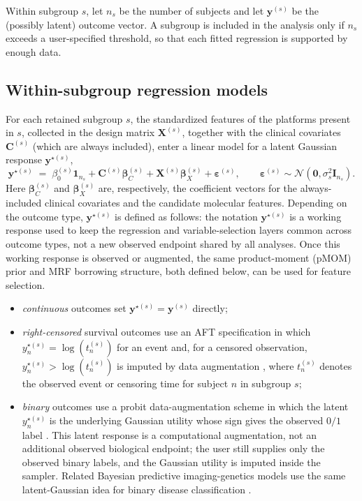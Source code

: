 \documentclass[article]{jss}
\begin{document}
Within subgroup $s$, let $n_s$ be the number of subjects and let
$\bm{y}^{(s)}$ be the (possibly latent) outcome vector. A subgroup is included
in the analysis only if $n_s$ exceeds a user-specified threshold, so that each
fitted regression is supported by enough data.

\subsection{Within-subgroup regression models}\label{sec:regression}

For each retained subgroup $s$, the standardized features of the platforms
present in $s$, collected in the design matrix $\bm{X}^{(s)}$, together with the
clinical covariates $\bm{C}^{(s)}$ (which are always included), enter a linear
model for a latent Gaussian response $\bm{y}^{\star(s)}$,
%
\begin{equation}\label{eq:linear}
  \bm{y}^{\star(s)} \;=\; \beta_0^{(s)}\bm{1}_{n_s}
  + \bm{C}^{(s)}\bm{\beta}_{C}^{(s)}
  + \bm{X}^{(s)}\bm{\beta}_{X}^{(s)} + \bm{\varepsilon}^{(s)},
  \qquad \bm{\varepsilon}^{(s)}\sim\mathcal{N}\!\left(\bm{0},\sigma_s^{2}\bm{I}_{n_s}\right).
\end{equation}
%
Here $\bm{\beta}_{C}^{(s)}$ and $\bm{\beta}_{X}^{(s)}$ are, respectively, the
coefficient vectors for the always-included clinical covariates and the
candidate molecular features. Depending on the outcome type,
$\bm{y}^{\star(s)}$ is defined as follows:
the notation $\bm{y}^{\star(s)}$ is a working response used to keep the
regression and variable-selection layers common across outcome types, not a new
observed endpoint shared by all analyses.  Once this working response is
observed or augmented, the same product-moment (pMOM) prior and MRF borrowing
structure, both defined below, can be used for feature selection.
%
\begin{itemize}
\item \emph{continuous} outcomes set $\bm{y}^{\star(s)}=\bm{y}^{(s)}$ directly;
\item \emph{right-censored} survival outcomes use an AFT specification in which
  $y^{\star(s)}_n=\log(t^{(s)}_n)$ for an event and, for a censored observation,
  $y^{\star(s)}_n>\log(t^{(s)}_n)$ is imputed by data augmentation
  \citep{tanner1987}, where $t^{(s)}_n$ denotes the observed event or censoring
  time for subject $n$ in subgroup $s$;
\item \emph{binary} outcomes use a probit data-augmentation scheme in which the
  latent $y^{\star(s)}_n$ is the underlying Gaussian utility whose sign gives the
  observed $0/1$ label \citep{albert1993}. This latent response is a
  computational augmentation, not an additional observed biological endpoint;
  the user still supplies only the observed binary labels, and the Gaussian
  utility is imputed inside the sampler.  Related Bayesian predictive
  imaging-genetics models use the same latent-Gaussian idea for binary disease
  classification
  \citep{chekouo2016aoas}.
\end{itemize}
\end{document}
